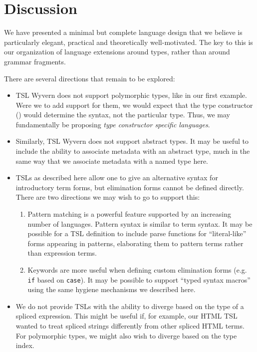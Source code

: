 
\section{Discussion}\label{s:discussion}
We have presented a minimal but complete language design that we believe is particularly elegant, practical and theoretically well-motivated. The key to this is our organization of language extensions around types, rather than around grammar fragments.

There are several directions that remain to be explored:
\begin{itemize}
\item TSL Wyvern does not support polymorphic types, like  in our first example. Were we to add support for them, we would expect that the type constructor () would determine the syntax, not the particular type. Thus, we may fundamentally be proposing \emph{type constructor specific languages}.
\item Similarly, TSL Wyvern does not support abstract types. It may be useful to include the ability to associate metadata with an abstract type, much in the same way that we associate metadata with a named type here.
\item TSLs as described here allow one to give an alternative syntax for introductory term forms, but elimination forms cannot be defined directly. There are two directions we may wish to go to support this:
\begin{enumerate}
\item Pattern matching is a powerful feature supported by an increasing number of languages. Pattern syntax is similar to term syntax. It may be possible for a TSL definition to include parse functions for ``literal-like'' forms appearing in patterns, elaborating them to pattern terms rather than expression terms.
\item Keywords are more useful when defining custom elimination forms (e.g. \verb|if| based on \verb|case|). It may be possible to support ``typed syntax macros'' using the same hygiene mechanisms we described here.
\end{enumerate}
\item We do not provide TSLs with the ability to diverge based on the type of a spliced expression. This might be useful if, for example, our HTML TSL wanted to treat spliced strings differently from other spliced HTML terms. For polymorphic types, we might also wish to diverge based on the type index.

\end{itemize}
